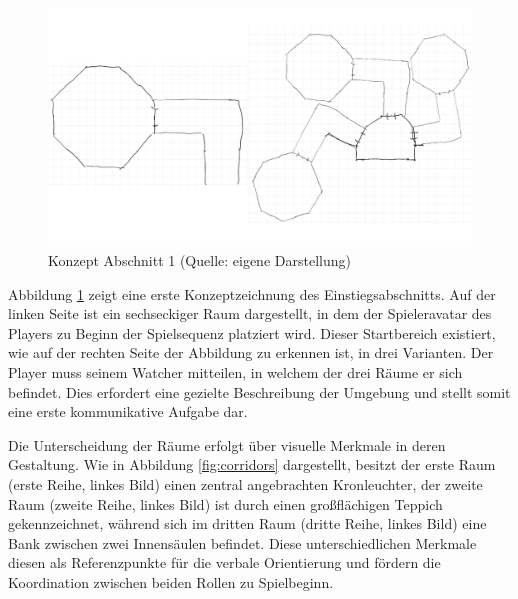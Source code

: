 \begin{figure}[ht]
\centering
\includegraphics[width=1\linewidth]{content/pictures/Abschnitt_Concept_00.png}
\caption{Konzept Abschnitt 1 (Quelle: eigene Darstellung)}
\label{fig:section_00_concept}
\end{figure}


Abbildung \ref{fig:section_00_concept} zeigt eine erste Konzeptzeichnung des Einstiegsabschnitts. Auf der linken Seite ist ein sechseckiger Raum dargestellt, in dem der Spieleravatar des Players zu Beginn der Spielsequenz platziert wird. Dieser Startbereich existiert, wie auf der rechten Seite der Abbildung zu erkennen ist, in drei Varianten. Der Player muss seinem Watcher mitteilen, in welchem der drei Räume er sich befindet. Dies erfordert eine gezielte Beschreibung der Umgebung und stellt somit eine erste kommunikative Aufgabe dar.

Die Unterscheidung der Räume erfolgt über visuelle Merkmale in deren Gestaltung. Wie in Abbildung \ref{fig:corridors} dargestellt, besitzt der erste Raum (erste Reihe, linkes Bild) einen zentral angebrachten Kronleuchter, der zweite Raum (zweite Reihe, linkes Bild) ist durch einen großflächigen Teppich gekennzeichnet, während sich im dritten Raum (dritte Reihe, linkes Bild) eine Bank zwischen zwei Innensäulen befindet. Diese unterschiedlichen Merkmale diesen als Referenzpunkte für die verbale Orientierung und fördern die Koordination zwischen beiden Rollen zu Spielbeginn.

